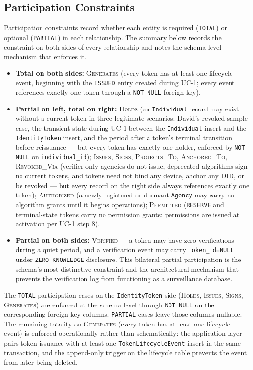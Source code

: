 \documentclass[11pt,letterpaper]{article}
\newcommand{\entity}[1]{\texttt{\color{navydark}#1}}
\begin{document}
\subsection{Participation Constraints}
\label{subsec:participation}

Participation constraints record whether each entity is required (\texttt{TOTAL}) or optional (\texttt{PARTIAL}) in each relationship. The summary below records the constraint on both sides of every relationship and notes the schema-level mechanism that enforces it.

\begin{itemize}
  \item \textbf{Total on both sides:} \textsc{Generates} (every token has at least one lifecycle event, beginning with the \texttt{ISSUED} entry created during UC-1; every event references exactly one token through a \texttt{NOT NULL} foreign key).
  \item \textbf{Partial on left, total on right:} \textsc{Holds} (an \entity{Individual} record may exist without a current token in three legitimate scenarios: David's revoked sample case, the transient state during UC-1 between the \entity{Individual} insert and the \entity{IdentityToken} insert, and the period after a token's terminal transition before reissuance --- but every token has exactly one holder, enforced by \texttt{NOT NULL} on \texttt{individual\_id}); \textsc{Issues}, \textsc{Signs}, \textsc{Projects\_To}, \textsc{Anchored\_To}, \textsc{Revoked\_Via} (verifier-only agencies do not issue, deprecated algorithms sign no current tokens, and tokens need not bind any device, anchor any DID, or be revoked --- but every record on the right side always references exactly one token); \textsc{Authorized} (a newly-registered or dormant \entity{Agency} may carry no algorithm grants until it begins operations); \textsc{Permitted} (\texttt{RESERVE} and terminal-state tokens carry no permission grants; permissions are issued at activation per UC-1 step 8).
  \item \textbf{Partial on both sides:} \textsc{Verified} --- a token may have zero verifications during a quiet period, and a verification event may carry \texttt{token\_id=NULL} under \texttt{ZERO\_KNOWLEDGE} disclosure. This bilateral partial participation is the schema's most distinctive constraint and the architectural mechanism that prevents the verification log from functioning as a surveillance database.
\end{itemize}

The \texttt{TOTAL} participation cases on the \entity{IdentityToken} side (\textsc{Holds}, \textsc{Issues}, \textsc{Signs}, \textsc{Generates}) are enforced at the schema level through \texttt{NOT NULL} on the corresponding foreign-key columns. \texttt{PARTIAL} cases leave those columns nullable. The remaining totality on \textsc{Generates} (every token has at least one lifecycle event) is enforced operationally rather than schematically: the application layer pairs token issuance with at least one \entity{TokenLifecycleEvent} insert in the same transaction, and the append-only trigger on the lifecycle table prevents the event from later being deleted.
\end{document}

